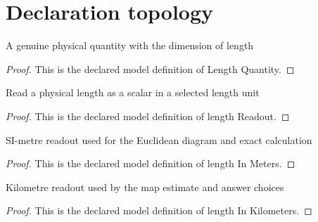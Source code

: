 \section{Declaration topology}
\begin{definition}
  \label{def:physics:phyx-mini-0726:phyxminiproblems-problemphyxmini0726-lengthquantity}
  A genuine physical quantity with the dimension of length
\end{definition}
\begin{proof}
  This is the declared model definition of Length Quantity.
\end{proof}
\begin{definition}
  \label{def:physics:phyx-mini-0726:phyxminiproblems-problemphyxmini0726-lengthreadout}
  Read a physical length as a scalar in a selected length unit
\end{definition}
\begin{proof}
  This is the declared model definition of length Readout.
\end{proof}
\begin{definition}
  \label{def:physics:phyx-mini-0726:phyxminiproblems-problemphyxmini0726-lengthinmeters}
  SI-metre readout used for the Euclidean diagram and exact calculation
\end{definition}
\begin{proof}
  This is the declared model definition of length In Meters.
\end{proof}
\begin{definition}
  \label{def:physics:phyx-mini-0726:phyxminiproblems-problemphyxmini0726-lengthinkilometers}
  Kilometre readout used by the map estimate and answer choices
\end{definition}
\begin{proof}
  This is the declared model definition of length In Kilometers.
\end{proof}
